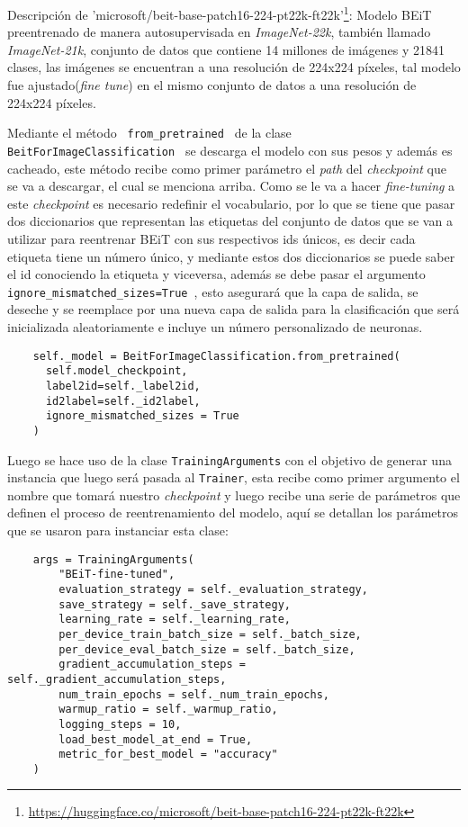 Descripción de 'microsoft/beit-base-patch16-224-pt22k-ft22k'\footnote[1]{\url{https://huggingface.co/microsoft/beit-base-patch16-224-pt22k-ft22k}}: Modelo BEiT preentrenado de manera autosupervisada en \textit{ImageNet-22k}, también llamado \textit{ImageNet-21k}, conjunto de datos que contiene 14 millones de imágenes y 21841 clases, las imágenes se encuentran a una resolución de 224x224 píxeles, tal modelo fue ajustado(\textit{fine tune}) en el mismo conjunto de datos a una resolución de 224x224 píxeles.

Mediante el método \texttt{ from\_pretrained } de  la clase \texttt{ BeitForImageClassification } se descarga el modelo con sus pesos y además es cacheado, este método recibe como primer parámetro el \textit{path} del \textit{checkpoint} que se va a descargar, el cual se menciona arriba. Como se le va a hacer \textit{fine-tuning} a este \textit{checkpoint} es necesario redefinir el vocabulario, por lo que se tiene que pasar dos diccionarios que representan las etiquetas del conjunto de datos que se van a utilizar para reentrenar BEiT con sus respectivos ids únicos, es decir cada etiqueta tiene un número único, y mediante estos dos diccionarios se puede saber el id conociendo la etiqueta y viceversa, además se debe pasar el argumento \texttt{ ignore\_mismatched\_sizes=True }, esto asegurará que la capa de salida, se deseche y se reemplace por una nueva capa de salida para la clasificación que será inicializada aleatoriamente e incluye un número personalizado de neuronas.

\begin{verbatim}
    self._model = BeitForImageClassification.from_pretrained(
      self.model_checkpoint,
      label2id=self._label2id,
      id2label=self._id2label,
      ignore_mismatched_sizes = True
    )
\end{verbatim}

Luego se hace uso de la clase \texttt{TrainingArguments} con el objetivo de generar una instancia que luego será pasada al \texttt{Trainer}, esta recibe como primer argumento el nombre que tomará nuestro \textit{checkpoint} y luego recibe una serie de parámetros que definen el proceso de reentrenamiento del modelo, aquí se detallan los parámetros que se usaron para instanciar esta clase:

\begin{verbatim}
    args = TrainingArguments(
        "BEiT-fine-tuned",
        evaluation_strategy = self._evaluation_strategy,
        save_strategy = self._save_strategy,
        learning_rate = self._learning_rate,
        per_device_train_batch_size = self._batch_size,
        per_device_eval_batch_size = self._batch_size,
        gradient_accumulation_steps = self._gradient_accumulation_steps,
        num_train_epochs = self._num_train_epochs,
        warmup_ratio = self._warmup_ratio,
        logging_steps = 10,
        load_best_model_at_end = True,
        metric_for_best_model = "accuracy"
    )
\end{verbatim}

